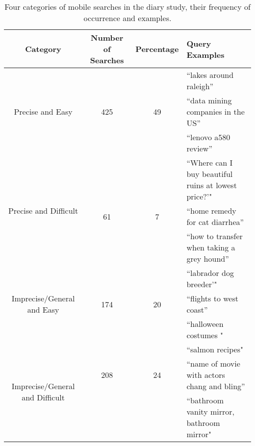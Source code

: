 



\begin{table*}[ht]
\begin{center}
    \begin{tabular}{ | c | c | c | l |}
    \hline
    Category &  Number of Searches & Percentage & Query Examples \\ \hline
   \multirow{3}{*}{Precise and Easy} & & &  ``lakes around raleigh'' \\
    					   & 425 & 49 & ``data mining companies in the US''\\ 				
					   & &  &  ``lenovo a580 review''  \\ \hline 
					   
   \multirow{3}{*}{Precise and Difficult} & & & ``Where can I buy beautiful ruins at lowest price?'"\\
    					   & 61 & 7 & ``home remedy for cat diarrhea''\\ 				
					   & &  & ``how to transfer when taking a grey hound''  \\ \hline 

   \multirow{3}{*}{ Imprecise/General and Easy} & & & ``labrador dog breeder'"\\
    					   & 174 & 20 & ``flights to west coast''\\
					   & & & ``halloween costumes "\\ \hline 

   \multirow{3}{*}{ Imprecise/General and Difficult} & & & ``salmon recipes"\\
    					   & 208 & 24 & ``name of movie with actors chang and bling''\\
					   & & & ``bathroom vanity mirror, bathroom mirror"\\ \hline 

   
 \end{tabular}
\end{center}
\label{searchcategories}
\caption{Four categories of mobile searches in the diary study, their frequency of occurrence and examples.}
\end{table*}


